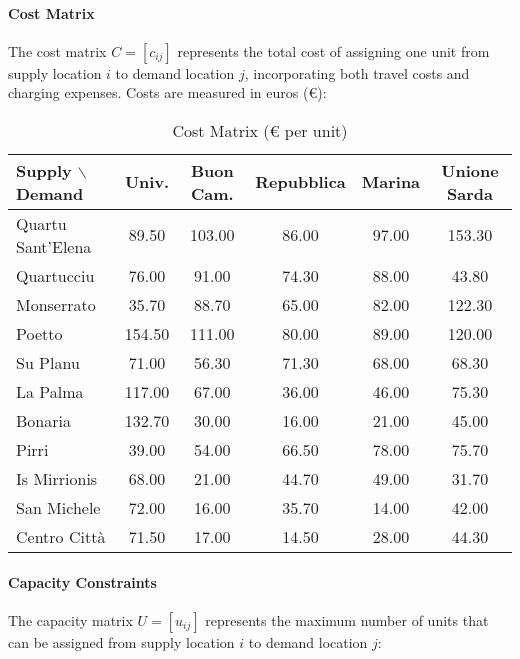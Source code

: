 \documentclass[12pt,a4paper]{article}
\begin{document}
\paragraph{Cost Matrix}
The cost matrix $C = [c_{ij}]$ represents the total cost of assigning one unit from supply location $i$ to demand location $j$, incorporating both travel costs and charging expenses. Costs are measured in euros (€):

\begin{table}[H]
\centering
\caption{Cost Matrix (€ per unit)}
\label{tab:cost_matrix}
\footnotesize
\begin{tabular}{@{}l|ccccc@{}}
\toprule
\textbf{Supply $\backslash$ Demand} & \textbf{Univ.} & \textbf{Buon Cam.} & \textbf{Repubblica} & \textbf{Marina} & \textbf{Unione Sarda} \\
\midrule
Quartu Sant'Elena & 89.50 & 103.00 & 86.00 & 97.00 & 153.30 \\
Quartucciu & 76.00 & 91.00 & 74.30 & 88.00 & 43.80 \\
Monserrato & 35.70 & 88.70 & 65.00 & 82.00 & 122.30 \\
Poetto & 154.50 & 111.00 & 80.00 & 89.00 & 120.00 \\
Su Planu & 71.00 & 56.30 & 71.30 & 68.00 & 68.30 \\
La Palma & 117.00 & 67.00 & 36.00 & 46.00 & 75.30 \\
Bonaria & 132.70 & 30.00 & 16.00 & 21.00 & 45.00 \\
Pirri & 39.00 & 54.00 & 66.50 & 78.00 & 75.70 \\
Is Mirrionis & 68.00 & 21.00 & 44.70 & 49.00 & 31.70 \\
San Michele & 72.00 & 16.00 & 35.70 & 14.00 & 42.00 \\
Centro Città & 71.50 & 17.00 & 14.50 & 28.00 & 44.30 \\
\bottomrule
\end{tabular}
\end{table}

\paragraph{Capacity Constraints}
The capacity matrix $U = [u_{ij}]$ represents the maximum number of units that can be assigned from supply location $i$ to demand location $j$:
\end{document}
